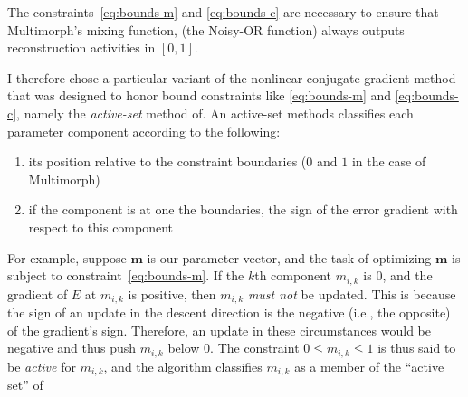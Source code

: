 The constraints~\ref{eq:bounds-m} and \ref{eq:bounds-c} are necessary to ensure that Multimorph's mixing function, (the Noisy-OR function) always outputs reconstruction activities in $[0,1]$.

I therefore chose a particular variant of the nonlinear conjugate gradient method that was designed to honor bound constraints like \eqref{eq:bounds-m} and \eqref{eq:bounds-c}, namely the \emph{active-set} method of\citet{cheng-and-li:2012}. 
An active-set methods classifies
each parameter component according to the following:
\begin{enumerate}
\item its position relative to the constraint boundaries ($0$ and $1$ in the case of Multimorph)
\item if the component is at one the boundaries, the sign of the error gradient with respect to this component
\end{enumerate}
For example, suppose $\textbf{m}$ is our parameter vector, and the task of optimizing $\textbf{m}$ is
subject to constraint~\ref{eq:bounds-m}. If the $k$th component $m_{i,k}$ is $0$, and the gradient of $E$ 
at $m_{i,k}$ is positive, then $m_{i,k}$ \emph{must not} be updated. This is
because the sign of an update in the descent direction is the negative (i.e., the opposite) of the gradient's sign. Therefore,
an update in these circumstances would be negative and thus push $m_{i,k}$ below $0$.
The constraint $0 \leq m_{i,k }\leq 1$ is thus said to be %
\emph{active} 
for $m_{i,k}$, and the algorithm classifies $m_{i,k}$ as a member of the ``active set'' of 
